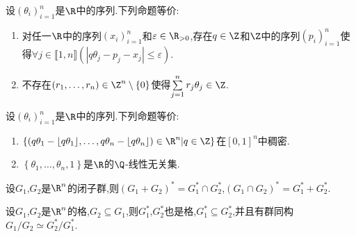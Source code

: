 \begin{corollary}{}{}
	设$\left(\theta_{i}\right)_{i=1}^{n}$是$\R$中的序列.下列命题等价:
	\begin{enumerate}
		\item 对任一$\R$中的序列$\left(x_{i}\right)_{i=1}^{n}$和$\varepsilon\in\R_{>0}$,存在$q\in\Z$和$\Z$中的序列$\left(p_{i}\right)_{i=1}^{n}$使得$\forall j\in\llbracket 1,n\rrbracket\left(\left|q\theta_{j}-p_{j}-x_{j}\right|\leqslant\varepsilon\right)$.
		\item 不存在$\left(r_{1},\ldots,r_{n}\right)\in\Z^{n}\setminus\left\{0\right\}$使得$\sum\limits_{j=1}^{n}r_{j}\theta_{j}\in\Z$.
	\end{enumerate}
\end{corollary}

\begin{corollary}{}{}
	设$\left(\theta_{i}\right)_{i=1}^{n}$是$\R$中的序列.下列命题等价:
	\begin{enumerate}
		\item $\left\{\left(q\theta_{1}-\lfloor q\theta_{1}\rfloor,\ldots,q\theta_{n}-\lfloor q\theta_{n}\rfloor\right)\in\R^{n}\middle|q\in\Z\right\}$在$\left[0,1\right]^{n}$中稠密.
		\item $\left\{\theta_{1},\ldots,\theta_{n},1\right\}$是$\R$的$\Q$-线性无关集.
	\end{enumerate}
\end{corollary}

\begin{proposition}{}{}
	设$G_{1}$,$G_{2}$是$\R^{n}$的闭子群,则$\left(G_{1}+G_{2}\right)^{\ast}=G_{1}^{\ast}\cap G_{2}^{\ast}$,$\left(G_{1}\cap G_{2}\right)^{\ast}=G_{1}^{\ast}+G_{2}^{\ast}$.
\end{proposition}

\begin{proposition}{}{}
	设$G_{1}$,$G_{2}$是$\R^{n}$的格,$G_{2}\subseteq G_{1}$,则$G_{1}^{\ast}$,$G_{2}^{\ast}$也是格,$G_{1}^{\ast}\subseteq G_{2}^{\ast}$,并且有群同构$G_{1}/G_{2}\simeq G_{2}^{\ast}/G_{1}^{\ast}$.
\end{proposition}